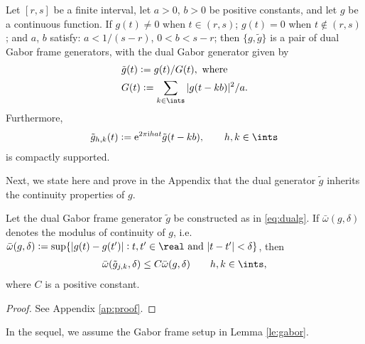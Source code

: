 \documentclass[a4paper, 12pt]{article}
\renewcommand{\i}{\mathrm{i}}
\newcommand{\sumi}{\ensuremath{\sum_{k \in \ints}}\xspace}
\newcommand{\tg}{\ensuremath{\tilde{g}}\xspace}
\newcommand{\hkints}{\ensuremath{h,k \in \ints}\xspace}
\newcommand{\modc}[2]{\ensuremath{{\bar{\omega}}({#1},#2)}\xspace}
\begin{document}
\begin{lem}\label{le:gabor}
  Let $[r,s]$ be a finite interval,  let $a> 0$, $b > 0$  be positive constants,  and let $g$ be a continuous function. If $g(t) \ne 0$ when $t \in (r,s)$; $g(t) = 0$ when $t \notin (r,s)$;  and  $a$, $b$ satisfy: $a < 1/(s-r)$, $0<b<s-r$; then  $\{g,\tilde{g}\}$ is a pair of dual Gabor frame generators, with the dual Gabor generator given by  
\begin{align}
  &\tilde{g}(t)  :=  g(t)/G(t), \text{ where} \label{eq:dualg}\\
  &G(t) := \sumi|g(t-kb)|^2/a.\label{eq:capg}
\end{align}
Furthermore, 
\begin{align}
  \tilde{g}_{h,k}(t) := \mathrm{e}^{2\pi\i h a t} \tilde{g}(t - kb), \qquad  h, k \in \ints \label{eq:dualghk}
\end{align}
is compactly supported.   
\end{lem}
\noindent Next, we state here and prove in the Appendix that the dual generator \tg  inherits the continuity properties of $g$.
\begin{lem} \label{lem:modtg}
  Let the dual Gabor frame generator $\tilde{g}$ be constructed as in \eqref{eq:dualg}. If $\modc{g}{\delta}$ denotes the modulus of continuity of $g$, i.e. $\modc{g}{\delta} := \sup \{|g(t) - g(t')| : t,t' \in \real \text{ and } |t -t'| < \delta\}$,  then   
  \begin{align}
    \modc{\tilde{g}_{j,k}}{\delta} \le C \modc{g}{\delta} \qquad  \hkints\notag,
    \label{}
  \end{align}
  where $C$ is a positive constant.
\end{lem}
\begin{proof}
  See Appendix \ref{ap:proof}.
\end{proof}
\noindent In the sequel,  we assume the Gabor frame setup in Lemma \ref{le:gabor}.
\end{document}
